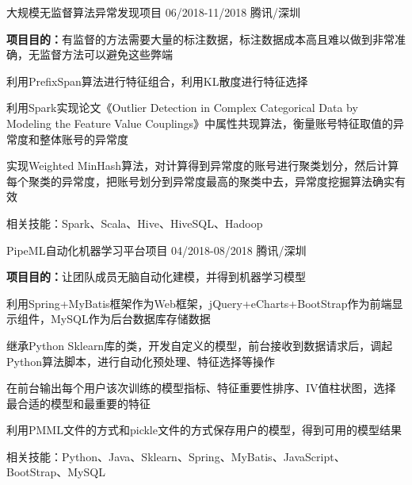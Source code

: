 \begin{cventries}
    \cventry
    {} %
    {大规模无监督算法异常发现项目} %
    {06/2018-11/2018} %
    {腾讯/深圳} %
    {
    \vspace{-8pt}
      \begin{cvitems} %
        \item {\textbf{项目目的：}有监督的方法需要大量的标注数据，标注数据成本高且难以做到非常准确，无监督方法可以避免这些弊端}
        \item {利用PrefixSpan算法进行特征组合，利用KL散度进行特征选择}
        \item {利用Spark实现论文《Outlier Detection in Complex Categorical Data by Modeling the Feature Value Couplings》中属性共现算法，衡量账号特征取值的异常度和整体账号的异常度}
        \item {实现Weighted MinHash算法，对计算得到异常度的账号进行聚类划分，然后计算每个聚类的异常度，把账号划分到异常度最高的聚类中去，异常度挖掘算法确实有效}
        \item {相关技能：Spark、Scala、Hive、HiveSQL、Hadoop}
      \end{cvitems}
    }
    
  \cventry
    { } %
    { PipeML自动化机器学习平台项目} %
    {04/2018-08/2018} %
    {腾讯/深圳} %
    {
    \vspace{-8pt}
      \begin{cvitems} %
      	\item{\textbf{项目目的：}让团队成员无脑自动化建模，并得到机器学习模型}
        \item {利用Spring+MyBatis框架作为Web框架，jQuery+eCharts+BootStrap作为前端显示组件，MySQL作为后台数据库存储数据}
        \item {继承Python Sklearn库的类，开发自定义的模型，前台接收到数据请求后，调起Python算法脚本，进行自动化预处理、特征选择等操作}
        \item{在前台输出每个用户该次训练的模型指标、特征重要性排序、IV值柱状图，选择最合适的模型和最重要的特征}
        \item{利用PMML文件的方式和pickle文件的方式保存用户的模型，得到可用的模型结果}
        \item{相关技能：Python、Java、Sklearn、Spring、MyBatis、JavaScript、BootStrap、MySQL}
      \end{cvitems}
    }
    

\end{cventries}
